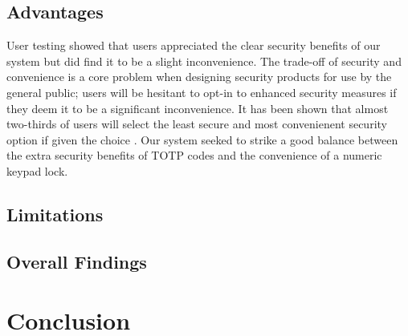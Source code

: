 \documentclass[conference]{IEEEtran}
\begin{document}
\subsection{Advantages}
User testing showed that users appreciated the clear security benefits of our system but did find it to be a slight inconvenience.
The trade-off of security and convenience is a core problem when designing security products for use by the general public; users will be hesitant to opt-in to enhanced security measures if they deem it to be a significant inconvenience.
It has been shown that almost two-thirds of users will select the least secure and most convenienent security option if given the choice \cite{b2}.
Our system seeked to strike a good balance between the extra security benefits of TOTP codes and the convenience of a numeric keypad lock.



\subsection{Limitations}

\subsection{Overall Findings}



\section{Conclusion}


\end{document}
